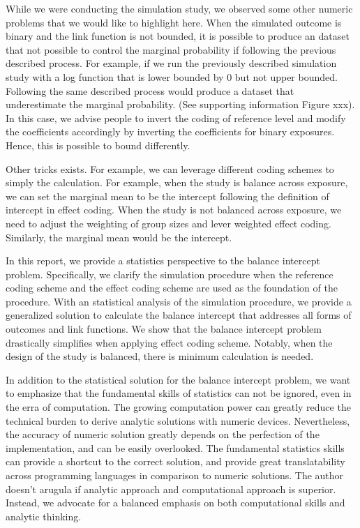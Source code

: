 \documentclass[
]{article}
\begin{document}
While we were conducting the simulation study, we observed some other
numeric problems that we would like to highlight here. When the
simulated outcome is binary and the link function is not bounded, it is
possible to produce an dataset that not possible to control the marginal
probability if following the previous described process. For example, if
we run the previously described simulation study with a log function
that is lower bounded by 0 but not upper bounded. Following the same
described process would produce a dataset that underestimate the
marginal probability. (See supporting information Figure xxx). In this
case, we advise people to invert the coding of reference level and
modify the coefficients accordingly by inverting the coefficients for
binary exposures. Hence, this is possible to bound differently.

Other tricks exists. For example, we can leverage different coding
schemes to simply the calculation. For example, when the study is
balance across exposure, we can set the marginal mean to be the
intercept following the definition of intercept in effect coding. When
the study is not balanced across exposure, we need to adjust the
weighting of group sizes and lever weighted effect coding. Similarly,
the marginal mean would be the intercept.

In this report, we provide a statistics perspective to the balance
intercept problem. Specifically, we clarify the simulation procedure
when the reference coding scheme and the effect coding scheme are used
as the foundation of the procedure. With an statistical analysis of the
simulation procedure, we provide a generalized solution to calculate the
balance intercept that addresses all forms of outcomes and link
functions. We show that the balance intercept problem drastically
simplifies when applying effect coding scheme. Notably, when the design
of the study is balanced, there is minimum calculation is needed.

In addition to the statistical solution for the balance intercept
problem, we want to emphasize that the fundamental skills of statistics
can not be ignored, even in the erra of computation. The growing
computation power can greatly reduce the technical burden to derive
analytic solutions with numeric devices. Nevertheless, the accuracy of
numeric solution greatly depends on the perfection of the
implementation, and can be easily overlooked. The fundamental statistics
skills can provide a shortcut to the correct solution, and provide great
translatability across programming languages in comparison to numeric
solutions. The author doesn't arugula if analytic approach and
computational approach is superior. Instead, we advocate for a balanced
emphasis on both computational skills and analytic thinking.
\end{document}
